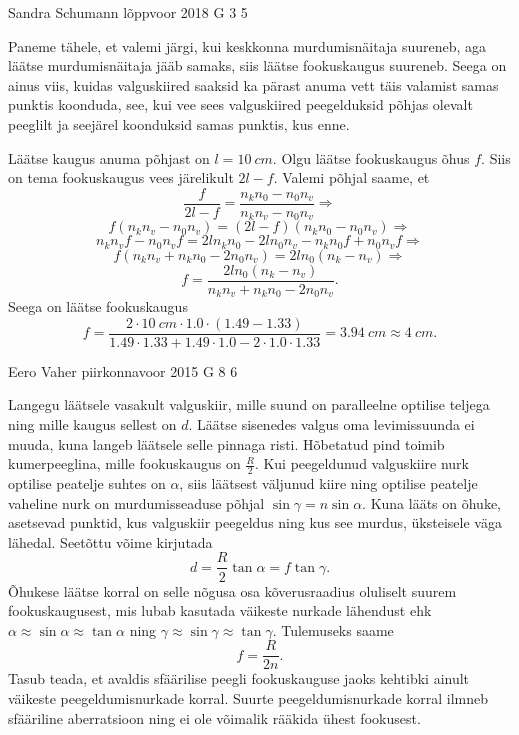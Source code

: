 \documentclass[11pt, twoside]{article}
\begin{document}
{%
{Sandra Schumann} %
{lõppvoor} %
{2018} %
{G 3} %
{5} %
{

\ifSolution
Paneme tähele, et valemi järgi, kui keskkonna murdumisnäitaja suureneb, aga läätse murdumisnäitaja jääb samaks, siis läätse fookuskaugus suureneb. Seega on ainus viis, kuidas valguskiired saaksid ka pärast anuma vett täis valamist samas punktis koonduda, see, kui vee sees valguskiired peegelduksid põhjas olevalt peeglilt ja seejärel koonduksid samas punktis, kus enne.

Läätse kaugus anuma põhjast on $l = \SI{10}{cm}$. Olgu läätse fookuskaugus õhus $f$. Siis on tema fookuskaugus vees järelikult $2l-f$. Valemi põhjal saame, et
\[ \frac{f}{2l-f} = \frac{n_k n_0 - n_0 n_v}{n_k n_v - n_0 n_v}\Rightarrow \]
\[ f(n_k n_v - n_0 n_v) = (2l-f)(n_k n_0 - n_0 n_v)\Rightarrow \]
\[ n_k n_v f - n_0 n_v f = 2l n_k n_0 - 2l n_0 n_v - n_k n_0 f + n_0 n_v f\Rightarrow \]
\[ f (n_k n_v + n_k n_0 - 2 n_0 n_v) = 2l n_0 (n_k - n_v)\Rightarrow \]
\[ f = \frac{2l n_0 (n_k - n_v)}{n_k n_v + n_k n_0 - 2 n_0 n_v}. \]
Seega on läätse fookuskaugus 
\[ f = \frac{\num{2} \cdot \SI{10}{cm} \cdot \num{1,0} \cdot (\num{1,49} - \num{1,33})}{\num{1,49}
\cdot \num{1,33} + \num{1,49} \cdot \num{1,0} - \num{2} \cdot \num{1,0} \cdot \num{1,33}} = \SI{3,94}{cm}
\approx \SI{4}{cm}. \]
\fi
}

{Eero Vaher} %
{piirkonnavoor} %
{2015} %
{G 8} %
{6} %
{

\ifSolution
Langegu läätsele vasakult valguskiir, mille suund on paralleelne optilise teljega ning mille kaugus sellest on $d$. Läätse sisenedes valgus oma levimissuunda ei muuda, kuna langeb läätsele selle pinnaga risti. Hõbetatud pind toimib kumerpeeglina, mille fookuskaugus on $\frac{R}{2}$. Kui peegeldunud valguskiire nurk optilise peatelje suhtes on $\alpha$, siis läätsest väljunud kiire ning optilise peatelje vaheline nurk on murdumisseaduse põhjal $\sin\gamma=n\sin\alpha$. Kuna lääts on õhuke, asetsevad punktid, kus valguskiir peegeldus ning kus see murdus, üksteisele väga lähedal. Seetõttu võime kirjutada
\[ d=\frac{R}{2}\tan\alpha=f\tan\gamma. \]
Õhukese läätse korral on selle nõgusa osa kõverusraadius oluliselt suurem fookuskaugusest, mis lubab kasutada väikeste nurkade lähendust ehk $\alpha\approx\sin\alpha\approx\tan\alpha$ ning $\gamma\approx\sin\gamma\approx\tan\gamma$. Tulemuseks saame
\[ f=\frac{R}{2n}. \]
Tasub teada, et avaldis sfäärilise peegli fookuskauguse jaoks kehtibki ainult väikeste peegeldumisnurkade korral. Suurte peegeldumisnurkade korral ilmneb sfääriline aberratsioon ning ei ole võimalik rääkida ühest fookusest.

}}
\end{document}
